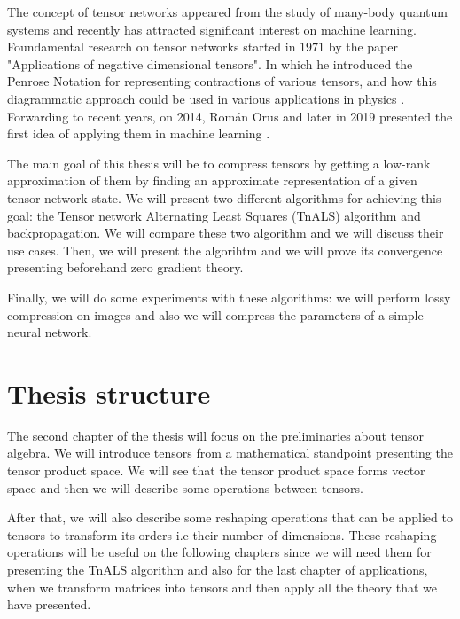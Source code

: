 \documentclass[11pt,a4paper,openright,oneside]{book}
\numberwithin{equation}{section}
\begin{document}
The concept of tensor networks appeared from the study of many-body quantum systems \cite{orusTensorNetworksComplex2019}
and recently has attracted significant interest on machine learning. 
Foundamental research on tensor networks started
in $1971$ by the paper "Applications of negative dimensional tensors". In which
he introduced the Penrose Notation for representing contractions of various tensors, and how this
diagrammatic approach could be used in various applications in physics \cite{biamonteLecturesQuantumTensor2020}. Forwarding
to recent years, on 2014, Román Orus \cite{181204011TensorNetworks} and later in 2019 presented the first
idea of applying them in machine learning \cite{orusTensorNetworksComplex2019}.

The main goal of this thesis will be to compress tensors by getting a low-rank approximation of them by
finding an approximate representation of a given tensor network state. We will present two different algorithms
for achieving this goal: the Tensor network Alternating Least Squares (\gls{TnALS}) algorithm and backpropagation. We will compare these two algorithm and we will
discuss their use cases. Then, we will present the  algorihtm and we will prove its convergence
presenting beforehand zero gradient theory.

Finally, we will do some experiments with these algorithms: we will perform lossy compression on images and
also we will compress the parameters of a simple neural network.


\section{Thesis structure}


The second chapter of the thesis will focus on the preliminaries about tensor algebra. We will introduce 
tensors from a mathematical standpoint presenting the tensor product space.
We will see that the tensor product space forms vector space and then we will describe
some operations between tensors.

After that, we will also describe some reshaping operations that can be applied to tensors to transform its
orders i.e their number of dimensions. These reshaping operations will be useful on the following chapters
since we will need them for presenting the TnALS algorithm and also for the last chapter of applications, when
we transform matrices into tensors and then apply all the theory that we have presented.
\end{document}
